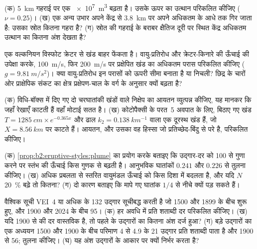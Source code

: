 \begin{exercise}[$\star\star$]\label{exo:b2:eruptive-styles:8}
(क) \qty{5}{km} गहराई पर एक  \qty{e7}{m^3} बढ़ता है। उसके ऊपर का
उत्थान परिकलित कीजिए ($\nu = 0.25$)। (ख) एक अन्य उभार अपने केंद्र से \qty{3.8}{km} पर
अपने अधिकतम के आधे तक गिर जाता है: उसका स्रोत कितना गहरा है? (ग) स्रोत की गहराई के बराबर
क्षैतिज दूरी पर स्थित केंद्र अधिकतम उत्थान का कितना अंश देखता
है?
\end{exercise}

\begin{exercise}[$\star\star$]\label{exo:b2:eruptive-styles:9}
एक वल्कनियन विस्फोट क्रेटर से खंड बाहर फेंकता है। वायु-प्रतिरोध
और क्रेटर-किनारे की ऊँचाई की उपेक्षा करके,
\qty{100}{m/s}, फिर \qty{200}{m/s} पर प्रक्षेपित खंड का अधिकतम परास परिकलित कीजिए ($g = \qty{9.81}{m/s^2}$)। क्या वायु-प्रतिरोध
इन परासों को ऊपरी सीमा बनाता है या निचली? छिद्र के चारों ओर
प्राक्षेपिक संकट का क्षेत्र प्रक्षेपण-चाल के वर्ग के अनुसार क्यों बढ़ता है?
\end{exercise}

\begin{exercise}[$\star\star\star$]\label{exo:b2:eruptive-styles:10}
(क) विधि-बॉक्स में दिए गए दो चरघातांकी खंडों वाले निक्षेप का आयतन व्युत्पन्न कीजिए,
यह मानकर कि जहाँ रेखाएँ काटती हैं वहाँ मोटाई सतत है। (ख)
कोटोपैक्सी के परत~5 अवपात के लिए, बिठाए गए खंड $T = \qty{1285}{cm}\times
e^{-0.365x}$ और ढाल $k_2 = \qty{0.138}{km^{-1}}$ वाला एक दूरस्थ खंड हैं, जो
$X = \qty{8.56}{km}$ पर काटते हैं। आयतन, और उसका वह हिस्सा जो प्रतिच्छेद-बिंदु से
परे है, परिकलित कीजिए।
\end{exercise}

\begin{exercise}[$\star\star\star$]\label{exo:b2:eruptive-styles:11}
(क) \cref{prop:b2:eruptive-styles:plume} का प्रयोग
करके बताइए कि उद्गार-दर को 100 से गुणा करने पर
स्तंभ की ऊँचाई किस गुणक से बढ़ती है। आनुभविक घातांकों $0.241$ और $0.226$ से तुलना कीजिए।
(ख) अधिक प्रबलता से स्तरित वायुमंडल ऊँचाई को किस दिशा में बदलता है, और यदि $N$
\qty{20}{\percent} बढ़े तो कितना? (ग) दो कारण बताइए कि मापे गए घातांक
$1/4$ से नीचे क्यों पड़ सकते हैं।
\end{exercise}

\begin{exercise}[$\star\star\star$]\label{exo:b2:eruptive-styles:12}
वैश्विक सूची VEI~4 या अधिक के 132 उद्गार सूचीबद्ध करती है जो 1500
और 1899 के बीच शुरू हुए, और 1900 और 2024 के बीच 95। (क) हर अवधि में प्रति शताब्दी दर
परिकलित कीजिए। (ख) यदि 1900 से की दर वास्तविक है, तो पहले के
उद्गारों का कितना अंश दर्ज हुआ? (ग) बड़े उद्गारों का एक अध्ययन 1500 और 1900 के बीच
परिमाण 4 से 4.9 के 21 उद्गार प्रति शताब्दी पाता है और 1900 से 56; तुलना कीजिए।
(घ) यह अंश उद्गारों के आकार पर क्यों निर्भर करता है?
\end{exercise}

